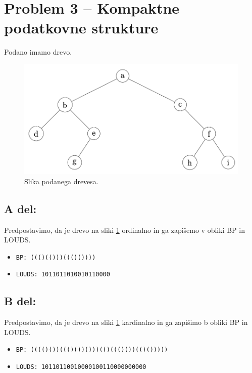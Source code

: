 \documentclass[a4paper,11pt]{article}
\begin{document}

\section*{Problem 3 -- Kompaktne podatkovne strukture}

\noindent
Podano imamo drevo.

\begin{figure}[ht!]
    \centering
    \includegraphics[width=120mm]{drevo3.png}
    \caption{Slika podanega drevesa.}\label{drevo}
\end{figure}

\subsection*{A del:}
Predpostavimo, da je drevo na sliki \ref{drevo} ordinalno in ga zapišemo v obliki BP in LOUDS.
\begin{itemize}
    \item \texttt{BP: ((()(()))((()())))}
    \item \texttt{LOUDS: 1011011010010110000}
\end{itemize}


\subsection*{B del:}
Predpostavimo, da je drevo na sliki \ref{drevo} kardinalno in ga zapišimo b obliki BP in LOUDS.
\begin{itemize}
    \item \texttt{BP: (((()())((()())()))(()((()())(()()))))}
    \item \texttt{LOUDS: 10110110010000100110000000000}
\end{itemize}
\end{document}
